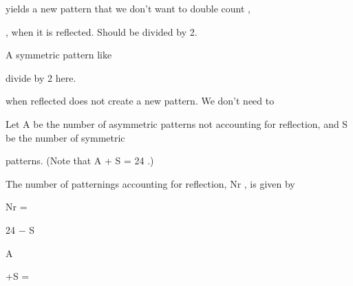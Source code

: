 \documentclass[a4paper,portrait,12pt]{article}
\begin{document}
\begin{flushleft}
yields a new pattern that we don't want to double count ,
\end{flushleft}





\begin{flushleft}
, when it is reflected. Should be divided by 2.
\end{flushleft}


\begin{flushleft}
A symmetric pattern like
\end{flushleft}


\begin{flushleft}
divide by 2 here.
\end{flushleft}





\begin{flushleft}
when reflected does not create a new pattern. We don't need to
\end{flushleft}





\begin{flushleft}
Let A be the number of asymmetric patterns not accounting for reflection, and S be the number of symmetric
\end{flushleft}


\begin{flushleft}
patterns. (Note that A + S = 24 .)
\end{flushleft}


\begin{flushleft}
The number of patternings accounting for reflection, Nr , is given by
\end{flushleft}





\begin{flushleft}
Nr =
\end{flushleft}





\begin{flushleft}
24 $-$ S
\end{flushleft}


\begin{flushleft}
A
\end{flushleft}


\begin{flushleft}
+S =
\end{flushleft}
\end{document}
